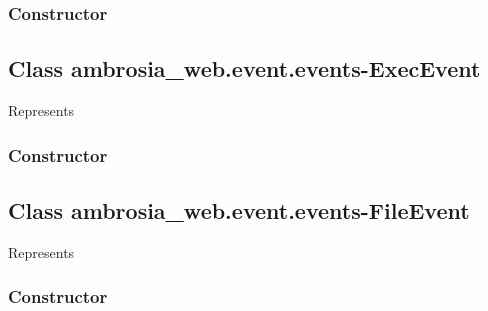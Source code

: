 \documentclass[letterpaper,10pt,english]{sphinxmanual}
\begin{document}
\subsubsection{Constructor}
\label{ambrosia_web.event.events-DeletePathEvent:constructor}

\begin{fulllineitems}
\label{ambrosia_web.event.events-DeletePathEvent:ambrosia_web.event.events-DeletePathEvent}
\end{fulllineitems}



\subsection{Class ambrosia\_web.event.events-ExecEvent}
\label{ambrosia_web.event.events-ExecEvent::doc}\label{ambrosia_web.event.events-ExecEvent:class-ambrosia-web-event-events-execevent}
Represents {\hyperref[ambrosia_plugins.lkm:ambrosia_plugins.lkm.events.ExecEvent]{}}


\subsubsection{Constructor}
\label{ambrosia_web.event.events-ExecEvent:constructor}

\begin{fulllineitems}
\label{ambrosia_web.event.events-ExecEvent:ambrosia_web.event.events-ExecEvent}
\end{fulllineitems}



\subsection{Class ambrosia\_web.event.events-FileEvent}
\label{ambrosia_web.event.events-FileEvent::doc}\label{ambrosia_web.event.events-FileEvent:class-ambrosia-web-event-events-fileevent}
Represents {\hyperref[ambrosia_plugins.lkm:ambrosia_plugins.lkm.events.FileEvent]{}}


\subsubsection{Constructor}
\label{ambrosia_web.event.events-FileEvent:constructor}
\end{document}
